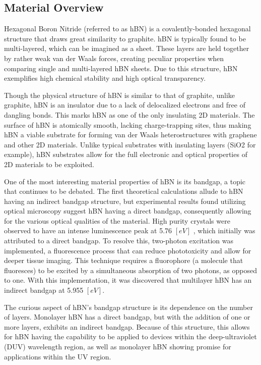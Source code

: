 \documentclass[conference]{IEEEtran}
\begin{document}
\subsection{Material Overview}

Hexagonal Boron Nitride (referred to as hBN) is a covalently-bonded hexagonal structure that draws great similarity to graphite. hBN is typically found to be multi-layered, which can be imagined as a sheet. These layers are held together by rather weak van der Waals forces, creating peculiar properties when comparing single and multi-layered hBN sheets. Due to this structure, hBN exemplifies high chemical stability and high optical transparency.

Though the physical structure of hBN is similar to that of graphite, unlike graphite, hBN is an insulator due to a lack of delocalized electrons and \cite{jb1} free of dangling bonds. This marks hBN as one of the only insulating 2D materials. The surface of hBN is atomically smooth, lacking charge-trapping sites, thus making hBN a viable substrate for forming van der Waals heterostructures with graphene and other 2D materials. Unlike typical substrates with insulating layers (SiO2 for example), hBN substrates allow for the full electronic and optical properties of 2D materials to be exploited. \cite{jb2}

One of the most interesting material properties of hBN is its bandgap, a topic that continues to be debated. The first theoretical calculations allude to hBN having an indirect bandgap structure, but experimental results found utilizing optical microscopy suggest hBN having a direct bandgap, consequently allowing for the various optical qualities of the material. High purity crystals were observed to have an intense luminescence peak at 5.76 $[\si{eV}]$ \cite{jb1}, which initially was attributed to a direct bandgap. To resolve this, two-photon excitation was implemented, a fluorescence process that can reduce phototoxicity and allow for deeper tissue imaging. This technique requires a fluorophore (a molecule that fluoresces) to be excited by a simultaneous absorption of two photons, as opposed to one. With this implementation, it was discovered that multilayer hBN has an indirect bandgap at 5.955 $[\si{eV}]$.

The curious aspect of hBN’s bandgap structure is its dependence on the number of layers. Monolayer hBN has a direct bandgap, but with the addition of one or more layers, exhibits an indirect bandgap. Because of this structure, this allows for hBN having the capability to be applied to devices within the deep-ultraviolet (DUV) wavelength region, as well as monolayer hBN showing promise for applications within the UV region.
\end{document}
